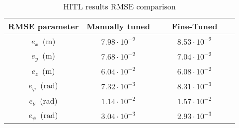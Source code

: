 \begin{table}[h!]
\centering
\caption{HITL results RMSE comparison}
\label{table:circular3_rmse_HITL}
\begin{tabular}{c|c|c}
\textbf{RMSE parameter} & \textbf{ Manually tuned} & \textbf{\ \ \ Fine-Tuned\ \ \ } \\
\hline
$e_{x}$\ (m) & $7.98\cdot 10^{-2}$ &  $8.53\cdot 10^{-2}$ \\
$e_{y}$\ (m) & $7.68\cdot 10^{-2}$ & $7.04\cdot 10^{-2}$ \\
$e_{z}$\ (m) & $6.04\cdot 10^{-2}$ &  $6.08\cdot 10^{-2}$ \\
$e_{\varphi}$\ (rad) & $7.32\cdot 10^{-3}$ & $8.31\cdot 10^{-3}$ \\
$e_{\theta}$\ (rad) &$ 1.14 \cdot 10^{-2}$ &  $1.57\cdot 10^{-2}$ \\
$e_{\psi}$\ (rad) & $3.04\cdot 10^{-3}$ & $2.93\cdot 10^{-3}$ \\
\end{tabular}
\end{table} 